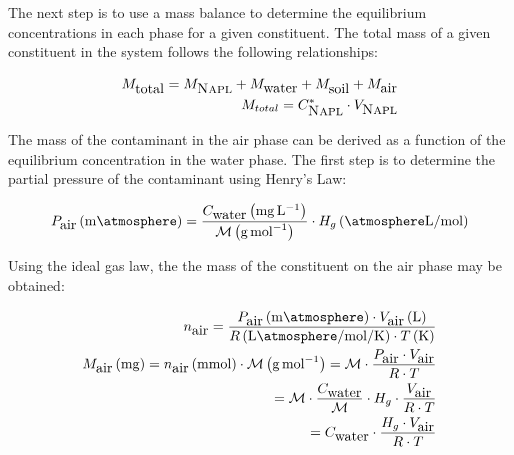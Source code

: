 \documentclass{homework}
\begin{document}
\begin{homeworkProblem}
\begin{homeworkSection}{}
\end{homeworkSection}


\begin{homeworkSection}{}

The next step is to use a mass balance to determine the equilibrium concentrations in each phase for a given constituent. The total mass of a given constituent in the system follows the following relationships:

\begin{align}
  M_{\mbox{total}} = M_{\mbox{{\scshape Napl}}} + M_{\mbox{water}} + M_{\mbox{soil}} + M_{\mbox{air}} \nonumber\\
  M_{total} = C^{*}_{\mbox{{\scshape Napl}}}\cdot V_{\mbox{{\scshape Napl}}}
\end{align}

\begin{variables}
\end{variables}

\end{homeworkSection}


\begin{homeworkSection}{}

The mass of the contaminant in the air phase can be derived as a function of the equilibrium concentration in the water phase. The first step is to determine the partial pressure of the contaminant using Henry’s Law:

\[
P_{\mbox{air}}\left(\si{\milli\atmosphere}\right) = \frac{
  C_{\mbox{water}}\left(\si{\milli\gram\per\liter}\right)
}{
 \mathcal{M}\left(\si{\gram\per\mole}\right)
}\cdot H_{g}\left(\si{\atmosphere\liter\per\mole}\right)
\]

\begin{variables}
\end{variables}

Using the ideal gas law, the the mass of the constituent on the air phase may be obtained:

\begin{align}
n_{\mbox{air}} = \frac{
  P_{\mbox{air}}\left(\si{\milli\atmosphere}\right)\cdot\vol{air}\left(\si{\liter}\right)
}{
  R\left(\si{\liter\atmosphere\per\mole\per\kelvin}\right)\cdot T\left(\si{\kelvin}\right)
}\nonumber\\
\mass{air}\left(\si{\milli\gram}\right) = n_{\mbox{air}}\left(\si{\milli\mole}\right)\cdot
  \mathcal{M}\left(\si{\gram\per\mole}\right) =
  \mathcal{M}\cdot\frac{P_{\mbox{air}}\cdot\vol{air}}{R\cdot T}\nonumber\\
= \mathcal{M}\cdot\frac{C_{\mbox{water}}}{\mathcal{M}}\cdot H_{g}\cdot\frac{\vol{air}}{R\cdot T}\nonumber\\
= C_{\mbox{water}}\cdot\frac{H_{g}\cdot\vol{air}}{R\cdot T}
\end{align}

\end{homeworkSection}

\end{homeworkProblem}


\end{document}
